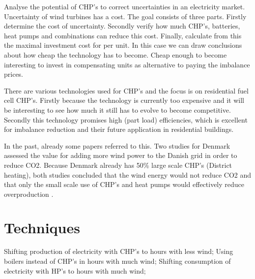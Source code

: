 Analyse the potential of CHP's to correct uncertainties in an electricity market. Uncertainty of wind turbines has a cost. The goal consists of three parts. Firstly determine the cost of uncertainty. Secondly verify how much CHP's, batteries, heat pumps and combinations can reduce this cost. Finally, calculate from this the maximal investment cost for per unit. In this case we can draw conclusions about how cheap the technology has to become. Cheap enough to become interesting to invest in compensating units as alternative to paying the imbalance prices.

There are various technologies used for CHP's and the focus is on residential fuel cell CHP's. Firstly because the technology is currently too expensive and it will be interesting to see how much it still has to evolve to become competitive. Secondly this technology promises high (part load) efficiencies, which is excellent for imbalance reduction and their future application in residential buildings.

In the past, already some papers referred to this. Two studies for Denmark assessed the value for adding more wind power to the Danish grid in order to reduce CO2. Because Denmark already has 50\% large scale CHP's (District heating), both studies concluded that the wind energy would not reduce CO2 and that only the small scale use of CHP's and heat pumps would effectively reduce overproduction \cite{Lund2005,Lund2003}.

\section{Techniques}
Shifting production of electricity with CHP's to hours with less wind; Using boilers instead of CHP's in hours with much wind; Shifting consumption of electricity with HP's to hours with much wind;